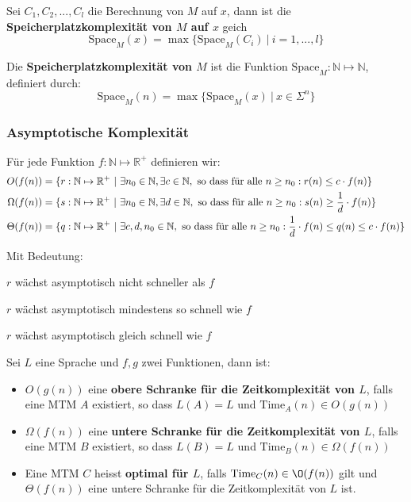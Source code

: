 \documentclass[11pt]{article}
\newcommand{\ttc}{\text{Time}}
\newcommand{\tsc}{\text{Space}}
\begin{document}
Sei $C_1, C_2,..., C_l$ die Berechnung von $M$ auf $x$, dann ist die \textbf{Speicherplatzkomplexität von $M$ auf $x$} geich
\begin{equation*}
	\tsc_M(x) = \max\{\tsc_M(C_i)\ |\ i = 1,...,l\}
\end{equation*}

Die \textbf{Speicherplatzkomplexität von $M$} ist die Funktion $\tsc_M: \mathbb{N} \mapsto \mathbb{N}$, definiert durch:
\begin{equation*}
	\tsc_M(n) = \max\{\tsc_M(x)\ |\ x \in \Sigma^n\}
\end{equation*}

\subsubsection{Asymptotische Komplexität}

Für jede Funktion $f: \mathbb{N} \mapsto \mathbb{R}^+$ definieren wir:
\begin{equation*}
\begin{split}
	O(f(n)) & = \{r: \mathbb{N} \mapsto \mathbb{R}^+\ |\ \exists n_0 \in \mathbb{N}, \exists c \in \mathbb{N}, \text{ so dass für alle $n \geq n_0: r(n) \leq c\cdot f(n)$}\}  \\
	\Omega(f(n)) & = \{s: \mathbb{N} \mapsto \mathbb{R}^+\ |\ \exists n_0 \in \mathbb{N}, \exists d \in \mathbb{N}, \text{ so dass für alle $n \geq n_0: s(n) \geq \frac{1}{d}\cdot f(n)$}\}  \\
	\Theta(f(n)) & = \{q: \mathbb{N} \mapsto \mathbb{R}^+\ |\ \exists c,d,n_0 \in \mathbb{N}, \text{ so dass für alle $ n \geq n_0: \frac{1}{d}\cdot f(n) \leq q(n) \leq c\cdot f(n)$}\}  \\
\end{split}
\end{equation*}

Mit Bedeutung:
\begin{description}[labelindent=16pt,style=multiline,leftmargin=3cm, noitemsep]
	\item[$r \in 0(f(n))$:] $r$ wächst asymptotisch nicht schneller als $f$
	\item[$s \in \Omega(f(n))$:] $r$ wächst asymptotisch mindestens so schnell wie $f$
	\item[$q \in \Theta(f(n))$:] $r$ wächst asymptotisch gleich schnell wie $f$
\end{description}

Sei $L$ eine Sprache und $f,g$ zwei Funktionen, dann ist:
\begin{itemize}[noitemsep]
	\item $O(g(n))$ eine \textbf{obere Schranke für die Zeitkomplexität von $L$}, falls eine MTM $A$ existiert, so dass $L(A) = L$ und $\ttc_A(n) \in O(g(n))$
	\item $\Omega(f(n))$ eine \textbf{untere Schranke für die Zeitkomplexität von $L$}, falls eine MTM $B$ existiert, so dass $L(B) = L$ und $\ttc_B(n) \in \Omega(f(n))$
	\item Eine MTM $C$ heisst \textbf{optimal für $L$}, falls $\ttc_C(n) \in \O(f(n))$ gilt und $\Theta(f(n))$ eine untere Schranke für die Zeitkomplexität von $L$ ist.
\end{itemize}
\end{document}
